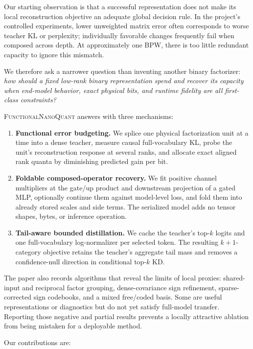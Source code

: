 \documentclass[10pt]{article}
\newcommand{\method}{\textsc{FunctionalNanoQuant}\xspace}
\begin{document}
Our starting observation is that a successful representation does not make
its local reconstruction objective an adequate global decision rule. In the
project's controlled experiments, lower unweighted matrix error often
corresponds to worse teacher KL or perplexity; individually favorable changes
frequently fail when composed across depth. At approximately one BPW, there is
too little redundant capacity to ignore this mismatch.

We therefore ask a narrower question than inventing another binary
factorizer: \emph{how should a fixed low-rank binary representation spend and
recover its capacity when end-model behavior, exact physical bits, and runtime
fidelity are all first-class constraints?}

\method answers with three mechanisms:

\begin{enumerate}
  \item \textbf{Functional error budgeting.} We splice one physical
  factorization unit at a time into a dense teacher, measure causal
  full-vocabulary KL, probe the unit's reconstruction response at several
  ranks, and allocate exact aligned rank quanta by diminishing predicted gain
  per bit.
  \item \textbf{Foldable composed-operator recovery.} We fit positive
  channel multipliers at the gate/up product and downstream projection of a
  gated MLP, optionally continue them against model-level loss, and fold them
  into already stored scales and side terms. The serialized model adds no
  tensor shapes, bytes, or inference operation.
  \item \textbf{Tail-aware bounded distillation.} We cache the teacher's
  top-$k$ logits and one full-vocabulary log-normalizer per selected token.
  The resulting $k+1$-category objective retains the teacher's aggregate tail
  mass and removes a confidence-null direction in conditional top-$k$ KD.
\end{enumerate}

The paper also records algorithms that reveal the limits of local proxies:
shared-input and reciprocal factor grouping, dense-covariance sign refinement,
sparse-corrected sign codebooks, and a mixed free/coded basis. Some are useful
representations or diagnostics but do not yet satisfy full-model transfer.
Reporting those negative and partial results prevents a locally attractive
ablation from being mistaken for a deployable method.

Our contributions are:
\end{document}
